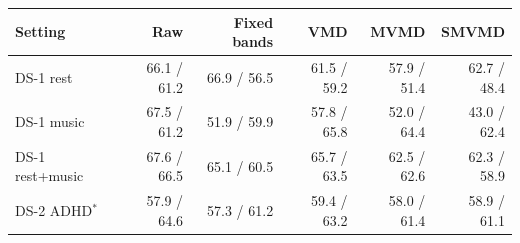 \small
\begin{tabular}{lrrrrr}
\hline
Setting & Raw & Fixed bands & VMD & MVMD & SMVMD \\
\hline
DS-1 rest & 66.1 / 61.2 & 66.9 / 56.5 & 61.5 / 59.2 & 57.9 / 51.4 & 62.7 / 48.4 \\
DS-1 music & 67.5 / 61.2 & 51.9 / 59.9 & 57.8 / 65.8 & 52.0 / 64.4 & 43.0 / 62.4 \\
DS-1 rest+music & 67.6 / 66.5 & 65.1 / 60.5 & 65.7 / 63.5 & 62.5 / 62.6 & 62.3 / 58.9 \\
DS-2 ADHD$^\ast$ & 57.9 / 64.6 & 57.3 / 61.2 & 59.4 / 63.2 & 58.0 / 61.4 & 58.9 / 61.1 \\
\hline
\end{tabular}
